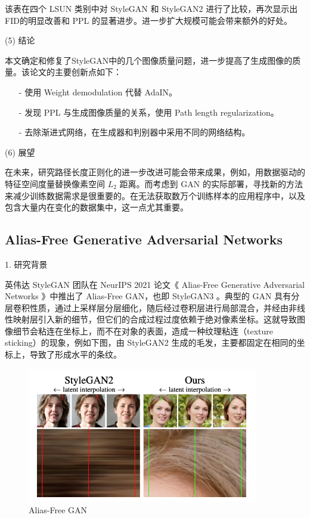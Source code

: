 该表在四个 LSUN 类别中对 StyleGAN 和 StyleGAN2 进行了比较，再次显示出FID的明显改善和 PPL 的显著进步。进一步扩大规模可能会带来额外的好处。

(5) 结论

本文确定和修复了StyleGAN中的几个图像质量问题，进一步提高了生成图像的质量。该论文的主要创新点如下：

\begin{enumerate}
 \item [-] 使用 Weight demodulation 代替 AdaIN。
 \item [-] 发现 PPL 与生成图像质量的关系，使用 Path length regularization。
 \item [-] 去除渐进式网络，在生成器和判别器中采用不同的网络结构。
\end{enumerate}

(6) 展望

在未来，研究路径长度正则化的进一步改进可能会带来成果，例如，用数据驱动的特征空间度量替换像素空间 $L_2$ 距离。而考虑到 GAN 的实际部署，寻找新的方法来减少训练数据需求是很重要的。在无法获取数万个训练样本的应用程序中，以及包含大量内在变化的数据集中，这一点尤其重要。

\subsection{Alias-Free Generative Adversarial Networks}

1. 研究背景

英伟达 StyleGAN 团队在 NeurIPS 2021 论文《 Alias-Free Generative Adversarial Networks 》中推出了 Alias-Free GAN，也即 StyleGAN3 。典型的 GAN 具有分层卷积性质，通过上采样层分层细化，随后经过卷积层进行局部混合，并经由非线性映射层引入新的细节，但它们的合成过程过度依赖于绝对像素坐标。这就导致图像细节会粘连在坐标上，而不在对象的表面，造成一种纹理粘连（texture sticking）的现象，例如下图，由 StyleGAN2 生成的毛发，主要都固定在相同的坐标上，导致了形成水平的条纹。

\begin{figure}[htb]
\centering 
\includegraphics[width=0.9\textwidth]{img/m2t20.png} 
\caption{Alias-Free GAN}
\label{Test}
\end{figure}

